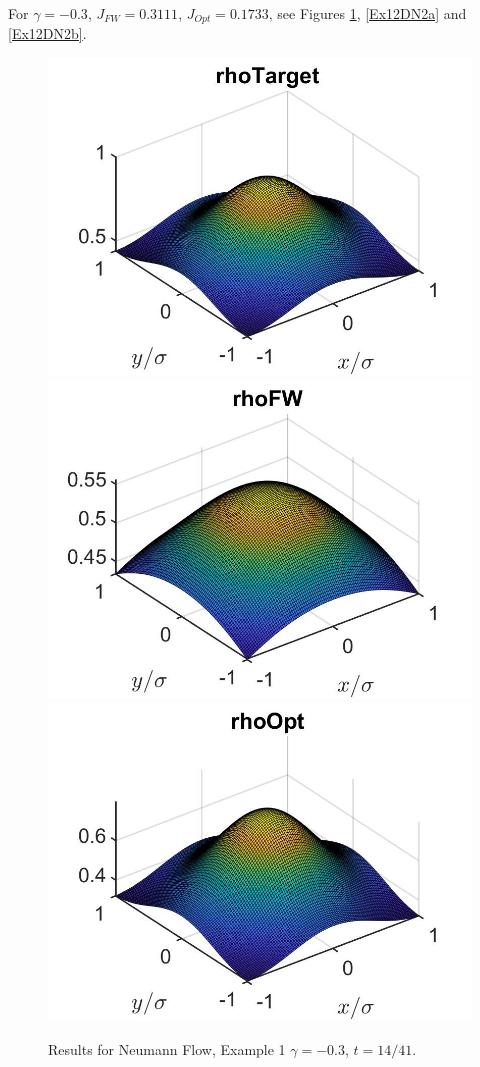 \documentclass[11pt, a4paper]{article}
\theoremstyle{definition}
\begin{document}
For $\gamma= -0.3$, $J_{FW} =0.3111$, $J_{Opt} = 0.1733$, see Figures \ref{Ex12DN2}, \ref{Ex12DN2a} and \ref{Ex12DN2b}.
\begin{figure}[h]
	\includegraphics[scale=0.3]{rhoHat2DN2.jpg}
	\includegraphics[scale=0.3]{rhoFW2DN2.jpg}
	\includegraphics[scale=0.3]{rhoOpt2DN2.jpg}
	\caption{Results for Neumann Flow, Example 1 $\gamma = -0.3$, $t = 14/41$.}
	\label{Ex12DN2}
\end{figure}
\end{document}
